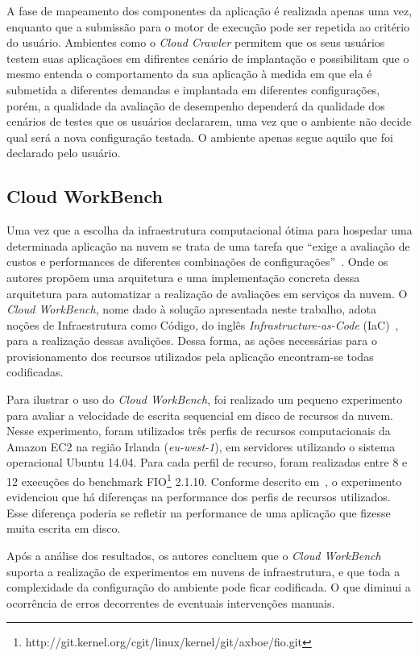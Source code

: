 A fase de mapeamento dos componentes da aplicação é realizada apenas uma vez, enquanto que a submissão para o motor de execução pode ser repetida ao critério do usuário. Ambientes como o {\em Cloud Crawler} permitem que os seus usuários testem suas aplicaçãoes em difirentes cenário de implantação e possibilitam que o mesmo entenda o comportamento da sua aplicação à medida em que ela é submetida a diferentes demandas e implantada em diferentes configurações, porém, a qualidade da avaliação de desempenho dependerá da qualidade dos cenários de testes que os usuários declararem, uma vez que o ambiente não decide qual será a nova configuração testada. O ambiente apenas segue aquilo que foi declarado pelo usuário.

\subsection{Cloud WorkBench}
Uma vez que a escolha da infraestrutura computacional ótima para hospedar uma determinada aplicação na nuvem se trata de uma tarefa que ``exige a avaliação de custos e performances de diferentes combinações de configurações''~\cite{scheuner2014cloud}. Onde os autores propõem uma arquitetura e uma implementação concreta dessa arquitetura para automatizar a realização de avaliações em serviços da nuvem. O {\em Cloud WorkBench}, nome dado à solução apresentada neste trabalho, adota noções de Infraestrutura como Código, do inglês {\em Infrastructure-as-Code} (IaC)~\cite{huttermann2012devops}, para a realização dessas avalições. Dessa forma, as ações necessárias para o provisionamento dos recursos utilizados pela aplicação encontram-se todas codificadas.

Para ilustrar o uso do \textit{Cloud WorkBench}, foi realizado um pequeno experimento para avaliar a velocidade de escrita sequencial em disco de recursos da nuvem. Nesse experimento, foram utilizados três perfis de recursos computacionais da Amazon EC2 na região Irlanda (\textit{eu-west-1}), em servidores utilizando o sistema operacional Ubuntu 14.04. Para cada perfil de recurso, foram realizadas entre 8 e 12 execuções do benchmark FIO\footnote{http://git.kernel.org/cgit/linux/kernel/git/axboe/fio.git} 2.1.10. Conforme descrito em~\cite{scheuner2014cloud}, o experimento evidenciou que há diferenças na performance dos perfis de recursos utilizados. Esse diferença poderia se refletir na performance de uma aplicação que fizesse muita escrita em disco.

Após a análise dos resultados, os autores concluem que o \textit{Cloud WorkBench} suporta a realização de experimentos em nuvens de infraestrutura, e que toda a complexidade da configuração do ambiente pode ficar codificada. O que diminui a ocorrência de erros decorrentes de eventuais intervenções manuais.

